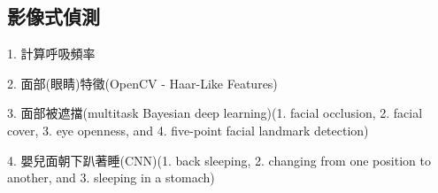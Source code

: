 \documentclass[class=NCU_thesis, crop=false]{standalone}
\begin{document}






\subsection{影像式偵測}
1. 計算呼吸頻率

2. 面部(眼睛)特徵(OpenCV - Haar-Like Features)

3. 面部被遮擋(multitask Bayesian deep learning)(1. facial occlusion, 2. facial cover, 3. eye openness, and 4. five-point facial landmark detection)

4. 嬰兒面朝下趴著睡(CNN)(1. back sleeping, 2. changing from one position to another, and 3. sleeping in a stomach)
\end{document}
